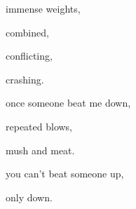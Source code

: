 \documentclass[extrafontsizes, 48pt]{memoir}
\newcommand\blankpage{%
    \null
    \thispagestyle{empty}%
    \addtocounter{page}{-1}%
    \newpage}
\begin{document}
	\begin{minipage}{.6\textwidth}
	immense weights,
	\end{minipage}
	\newpage

	\begin{minipage}{.6\textwidth}
	combined,
	\end{minipage}
	\newpage

	\begin{minipage}{.6\textwidth}
	conflicting,
	\end{minipage}
	\newpage

	\begin{minipage}{.6\textwidth}
	crashing.
	\afterpage{\blankpage}
	\end{minipage}
	\newpage

	\begin{minipage}{.6\textwidth}
	once someone beat me down,
	\end{minipage}
	\newpage

	\begin{minipage}{.6\textwidth}
	repeated blows,
	\end{minipage}
	\newpage

	\begin{minipage}{.6\textwidth}
	mush and meat.
	\end{minipage}
	\newpage

	\begin{minipage}{.6\textwidth}
	you can't beat someone up,
	\end{minipage}
	\newpage

	\begin{minipage}{.6\textwidth}
	only down.
	\afterpage{\blankpage}
	\end{minipage}
	\newpage
\end{document}
